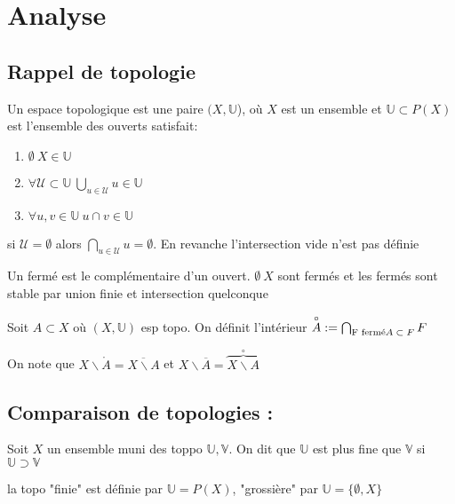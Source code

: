 

\section{Analyse}
\subsection{ Rappel de topologie }
        Un espace topologique est une paire $(X, \mathbb{U}$), où $X$ est un ensemble et $\mathbb{U}\subset P(X)$ est l'ensemble des ouverts satisfait:\\
        \begin{enumerate}
            \item $\emptyset \ X\in \mathbb{U}$
            \item $\forall \mathcal{U}\subset \mathbb{U}\ \bigcup_{u\in \mathcal{U}} u\in \mathbb{U}$
            \item $\forall u,v\in \mathbb{U}\ u \cap v \in \mathbb{U}$
            \end{enumerate}
\begin{remarque}
si $\mathcal{U}=\emptyset $ alors $\bigcap_{u\in \mathcal{U}} u = \emptyset $. En revanche l'intersection vide n'est pas définie
\end{remarque}
\begin{remarque}
Un fermé est le complémentaire d'un ouvert. $\emptyset \ X$ sont fermés et les fermés sont stable par union finie et intersection quelconque
\end{remarque}

\begin{definition}
     Soit $A\subset X$ où $(X,\mathbb{U})$ esp topo. On définit l'intérieur $\overset{\circ}{A}:=\bigcap_{\text{F fermé\\$A\subset F$}}F$
\end{definition}
On note que $X\backslash\mathring{A}=\overline{X\backslash A}$ et $X\backslash\overline{A} =\overbrace{X\backslash A}^{\circ}$

\subsection{Comparaison de topologies :}
\begin{definition}
    Soit $X$ un ensemble muni des toppo $\mathbb{U},\mathbb{V}$. On dit que $\mathbb{U}$ est plus fine que $\mathbb{V}$ si $\mathbb{U}\supset\mathbb{V}$
\end{definition}
\begin{ex}
la topo "finie" est définie par $\mathbb{U}=P(X)$, "grossière" par $\mathbb{U}=\{\emptyset, X\}$
\end{ex}

